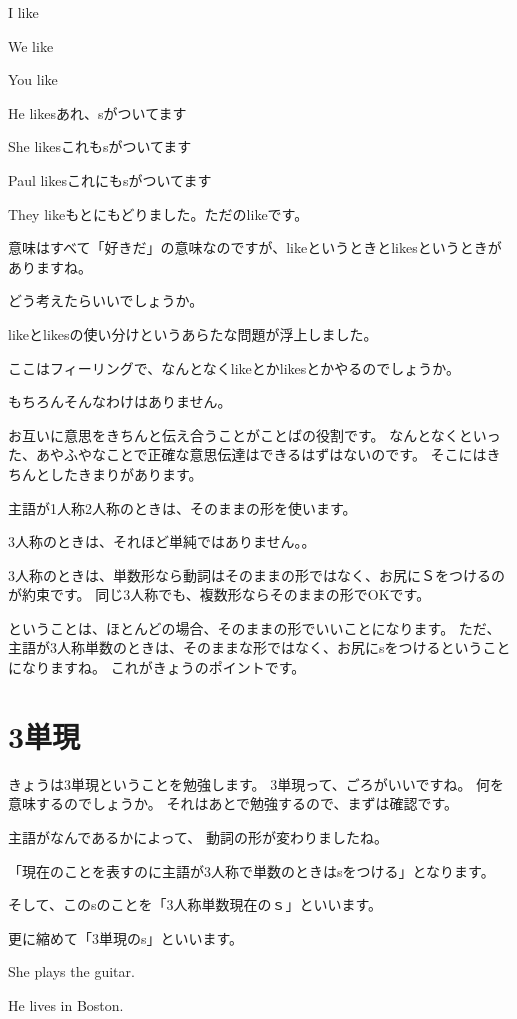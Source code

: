 \documentclass[book,jafontscale=0.9247]{jlreq}
\begin{document}
I like

We like

You like

He likesあれ、sがついてます

She likesこれもsがついてます

Paul likesこれにもsがついてます

They likeもとにもどりました。ただのlikeです。

意味はすべて「好きだ」の意味なのですが、likeというときとlikesというときがありますね。

どう考えたらいいでしょうか。

likeとlikesの使い分けというあらたな問題が浮上しました。

ここはフィーリングで、なんとなくlikeとかlikesとかやるのでしょうか。

もちろんそんなわけはありません。


お互いに意思をきちんと伝え合うことがことばの役割です。
なんとなくといった、あやふやなことで正確な意思伝達はできるはずはないのです。
そこにはきちんとしたきまりがあります。

主語が1人称2人称のときは、そのままの形を使います。

3人称のときは、それほど単純ではありません。。

3人称のときは、単数形なら動詞はそのままの形ではなく、お尻にＳをつけるのが約束です。
同じ3人称でも、複数形ならそのままの形でOKです。

ということは、ほとんどの場合、そのままの形でいいことになります。
ただ、主語が3人称単数のときは、そのままな形ではなく、お尻にsをつけるということになりますね。
これがきょうのポイントです。

 \section{3単現}
きょうは3単現ということを勉強します。
3単現って、ごろがいいですね。
何を意味するのでしょうか。
それはあとで勉強するので、まずは確認です。

主語がなんであるかによって、
動詞の形が変わりましたね。

「現在のことを表すのに主語が3人称で単数のときはsをつける」となります。



そして、このsのことを「3人称単数現在のｓ」といいます。

更に縮めて「3単現のs」といいます。

She plays the guitar.

He lives in Boston.
\end{document}
